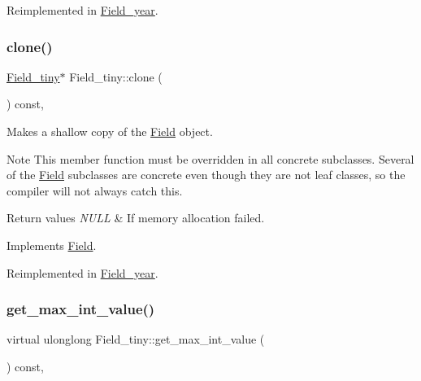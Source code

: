 Reimplemented in \mbox{\hyperlink{classField__year_a14b179ace36d418dd8e3fc714fef9a41}{Field\+\_\+year}}.

\mbox{\label{classField__tiny_a93e167fcbd0814d8b0f03884c5f02887}} 
\subsubsection{\texorpdfstring{clone()}{clone()}\hspace{0.1cm}{\footnotesize\ttfamily [2/2]}}
{\footnotesize\ttfamily \mbox{\hyperlink{classField__tiny}{Field\+\_\+tiny}}$\ast$ Field\+\_\+tiny\+::clone (\begin{DoxyParamCaption}{ }\end{DoxyParamCaption}) const\hspace{0.3cm}{\ttfamily [inline]}, {\ttfamily [virtual]}}

Makes a shallow copy of the \mbox{\hyperlink{classField}{Field}} object.

\begin{DoxyNote}{Note}
This member function must be overridden in all concrete subclasses. Several of the \mbox{\hyperlink{classField}{Field}} subclasses are concrete even though they are not leaf classes, so the compiler will not always catch this.
\end{DoxyNote}

\begin{DoxyRetVals}{Return values}
{\em N\+U\+LL} & If memory allocation failed. \\
\hline
\end{DoxyRetVals}


Implements \mbox{\hyperlink{classField_a01a9a9aa3a618941e839b1b8793c969d}{Field}}.



Reimplemented in \mbox{\hyperlink{classField__year_a6c270a994f22f6c4979091d31a453942}{Field\+\_\+year}}.

\mbox{\label{classField__tiny_af359459fc3d3a2994dfb48f598ec553b}} 
\subsubsection{\texorpdfstring{get\+\_\+max\+\_\+int\+\_\+value()}{get\_max\_int\_value()}}
{\footnotesize\ttfamily virtual ulonglong Field\+\_\+tiny\+::get\+\_\+max\+\_\+int\+\_\+value (\begin{DoxyParamCaption}{ }\end{DoxyParamCaption}) const\hspace{0.3cm}{\ttfamily [inline]}, {\ttfamily [virtual]}}

